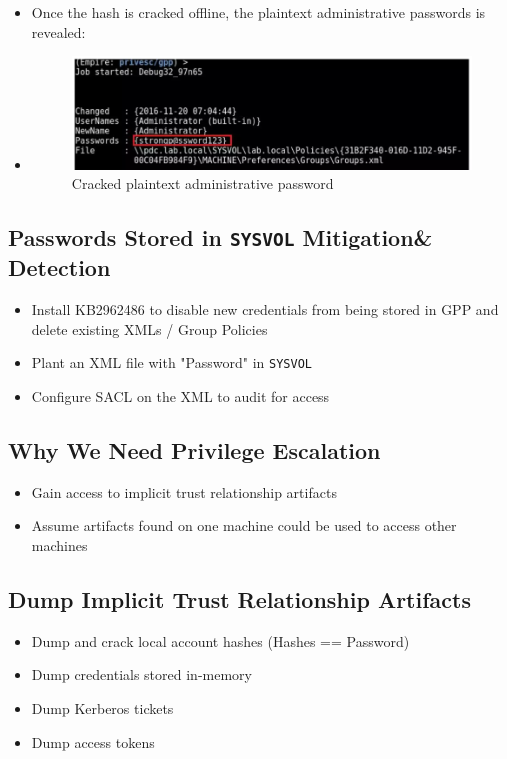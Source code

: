 \begin{itemize}
    \item Once the hash is cracked offline, the plaintext administrative passwords is revealed:
    \item 
\begin{figure}
    \centering
    \includegraphics[width=0.75\linewidth]{crackedpwd.png}
    \caption{Cracked plaintext administrative password}
    \label{fig:placeholder}
\end{figure}
\end{itemize}
\subsection{Passwords Stored in \texttt{SYSVOL} Mitigation\& Detection}
\begin{itemize}
    \item Install KB2962486 to disable new credentials from being stored in GPP and delete existing XMLs / Group Policies
    \item Plant an XML file with "Password" in \texttt{SYSVOL}
    \item Configure SACL on the XML to audit for access
\end{itemize}

\subsection{Why We Need Privilege Escalation}
\begin{itemize}
    \item Gain access to implicit trust relationship artifacts
    \item Assume artifacts found on one machine could be used to access other machines
\end{itemize}

\subsection{Dump Implicit Trust Relationship Artifacts}
\begin{itemize}
    \item Dump and crack local account hashes (Hashes == Password)
    \item Dump credentials stored in-memory
    \item Dump Kerberos tickets
    \item Dump access tokens
\end{itemize}

